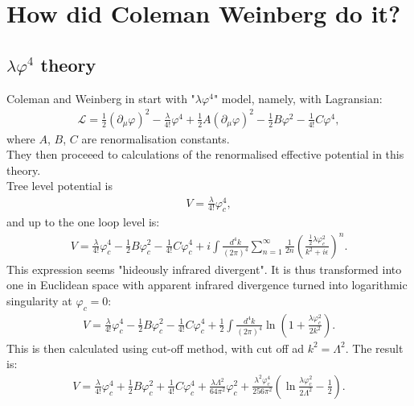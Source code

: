 \chapter{How did Coleman Weinberg do it?}
\section{$\lambda\varphi^4$ theory}
Coleman and Weinberg in \cite{Coleman1973} start with "$\lambda\varphi^4$" model, namely, with 
Lagransian:
\begin{align}
\mathcal{L} = \frac{1}{2}(\partial_\mu\varphi)^2-\frac{\lambda}{4!}\varphi^4+\frac{1}{2}
A(\partial_\mu\varphi)^2-\frac{1}{2}B\varphi^2-\frac{1}{4!}C\varphi^4,
\end{align}
where $A$, $B$, $C$ are renormalisation constants. \\
They then proceeed to calculations of the renormalised effective potential in this theory. \\
Tree level potential is
\begin{align}
V=\frac{\lambda}{4!}\varphi_c^4,
\end{align}
and up to the one loop level is:
\begin{align}
V = \frac{\lambda}{4!}\varphi_c^4-\frac{1}{2}B\varphi_c^2-\frac{1}{4!}C\varphi_c^4 + 
i\int\frac{d^4k}{(2\pi)^4}\sum\limits_{n=1}^\infty\frac{1}{2n}
\left(\frac{\frac{1}{2}\lambda\varphi_c^2}{k^2+i\epsilon}\right)^n.
\end{align} 
This expression seems "hideously infrared divergent". It is thus transformed into one 
in Euclidean space with apparent infrared divergence turned into logarithmic singularity at 
$\varphi_c=0$:
\begin{align}
V=\frac{\lambda}{4!}\varphi_c^4-\frac{1}{2}B\varphi_c^2-\frac{1}{4!}C\varphi_c^4 +
\frac{1}{2}\int\frac{d^4k}{(2\pi)^4}\ln\left(1+\frac{\lambda\varphi_c^2}{2k^2}\right).
\end{align}
This is then calculated using cut-off method, with cut off ad $k^2 = \Lambda^2$. 
The result is:
\begin{align}
V=\frac{\lambda}{4!}\varphi_c^4+\frac{1}{2}B\varphi_c^2+\frac{1}{4!}C\varphi_c^4+
\frac{\lambda\Lambda^2}{64\pi^2}\varphi_c^2+\frac{\lambda^2\varphi_c^4}{256\pi^2}
\left(\ln\frac{\lambda\varphi_c^2}{2\Lambda^2}-\frac{1}{2}\right).
\end{align}
